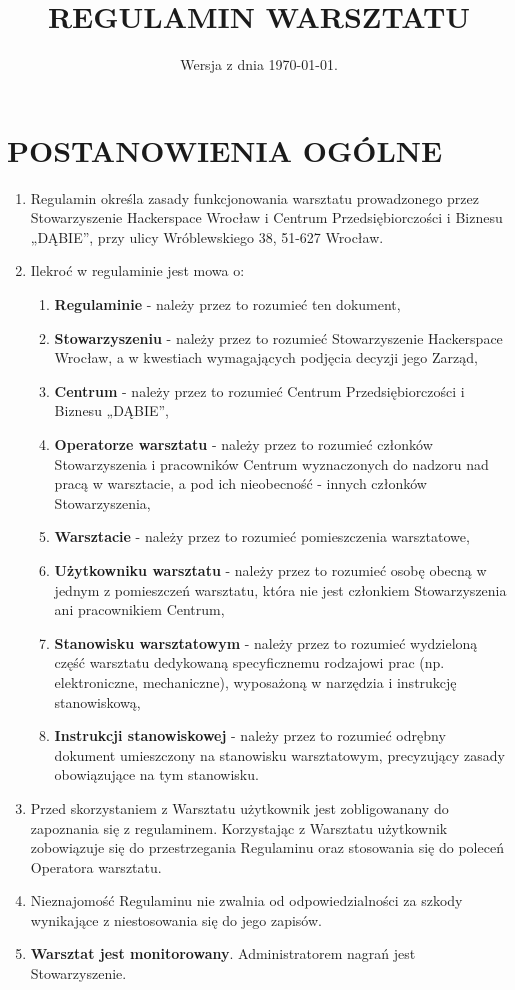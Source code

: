 \documentclass{article}
\title{\huge REGULAMIN WARSZTATU}
\date{Wersja z dnia \today.}
\begin{document}
\maketitle
\section{POSTANOWIENIA OGÓLNE}
    \begin{enumerate}
  	\item Regulamin określa zasady funkcjonowania warsztatu prowadzonego przez Stowarzyszenie Hackerspace Wrocław i Centrum Przedsiębiorczości i Biznesu „DĄBIE”, przy ulicy Wróblewskiego 38, 51-627 Wrocław. 
  	\item Ilekroć w regulaminie jest mowa o:
        \begin{enumerate}
        \item \textbf{Regulaminie} - należy przez to rozumieć ten dokument,
        \item \textbf{Stowarzyszeniu} - należy przez to rozumieć Stowarzyszenie Hackerspace Wrocław, a w kwestiach wymagających podjęcia decyzji jego Zarząd,
        \item \textbf{Centrum} - należy przez to rozumieć Centrum Przedsiębiorczości i Biznesu „DĄBIE”,
        \item \textbf{Operatorze warsztatu} - należy przez to rozumieć członków Stowarzyszenia i pracowników Centrum wyznaczonych do nadzoru nad pracą w warsztacie, a pod ich nieobecność - innych członków Stowarzyszenia,
        \item \textbf{Warsztacie} - należy przez to rozumieć pomieszczenia warsztatowe,  
        \item \textbf{Użytkowniku warsztatu} - należy przez to rozumieć osobę obecną w jednym z pomieszczeń warsztatu, która nie jest członkiem Stowarzyszenia ani pracownikiem Centrum,
        \item \textbf{Stanowisku warsztatowym} - należy przez to rozumieć wydzieloną część warsztatu dedykowaną specyficznemu rodzajowi prac (np. elektroniczne, mechaniczne), wyposażoną w narzędzia i instrukcję stanowiskową,
        \item \textbf{Instrukcji stanowiskowej} - należy przez to rozumieć odrębny dokument umieszczony na stanowisku warsztatowym, precyzujący zasady obowiązujące na tym stanowisku.
        \end{enumerate}
    \item Przed skorzystaniem z Warsztatu użytkownik jest zobligowanany do zapoznania się z regulaminem. Korzystając z Warsztatu użytkownik zobowiązuje się do przestrzegania Regulaminu oraz stosowania się do poleceń Operatora warsztatu.
    \item Nieznajomość Regulaminu nie zwalnia od odpowiedzialności za szkody wynikające z niestosowania się do jego zapisów.
    	\item \textbf{Warsztat jest monitorowany}. Administratorem nagrań jest Stowarzyszenie.
    \end{enumerate}
\end{document}
